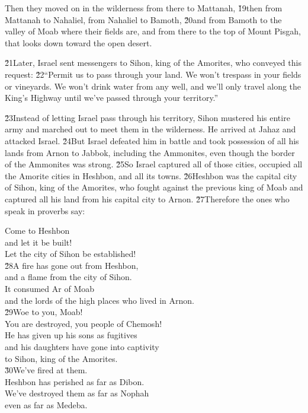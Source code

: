 Then they moved on in the wilderness from there to Mattanah, \v{19}then from Mattanah to Nahaliel, from Nahaliel to Bamoth, \v{20}and from Bamoth to the valley of Moab where their fields are, and from there to the top of Mount Pisgah, that looks down toward the open desert.

\v{21}Later, Israel sent messengers to Sihon, king of the Amorites, who conveyed this request: \v{22}``Permit us to pass through your land. We won't trespass in your fields or vineyards. We won't drink water from any well, and we'll only travel along the King's Highway until we've passed through your territory.''

\v{23}Instead of letting Israel pass through his territory, Sihon mustered his entire army and marched out to meet them in the wilderness. He arrived at Jahaz and attacked Israel. \v{24}But Israel defeated him in battle and took possession of all his lands from Arnon to Jabbok, including the Ammonites, even though the border of the Ammonites was strong. \v{25}So Israel captured all of those cities, occupied all the Amorite cities in Heshbon, and all its towns. \v{26}Heshbon was the capital city of Sihon, king of the Amorites, who fought against the previous king of Moab and captured all his land from his capital city to Arnon. \v{27}Therefore the ones who speak in proverbs say:

\begin{poetry}
\poeml Come to Heshbon \\
\poemll    and let it be built! \\
\poemlll       Let the city of Sihon be established! \\
\poeml \v{28}A fire has gone out from Heshbon, \\
\poemll    and a flame from the city of Sihon. \\
\poeml It consumed Ar of Moab \\
\poemll    and the lords of the high places who lived in Arnon. \\
\poeml \v{29}Woe to you, Moab! \\
\poemll    You are destroyed, you people of Chemosh! \\
\poeml He has given up his sons as fugitives \\
\poemll    and his daughters have gone into captivity \\
\poemlll       to Sihon, king of the Amorites. \\
\poeml \v{30}We've fired at them. \\
\poemll    Heshbon has perished as far as Dibon. \\
\poeml We've destroyed them as far as Nophah \\
\poemll    even as far as Medeba.
\end{poetry}


